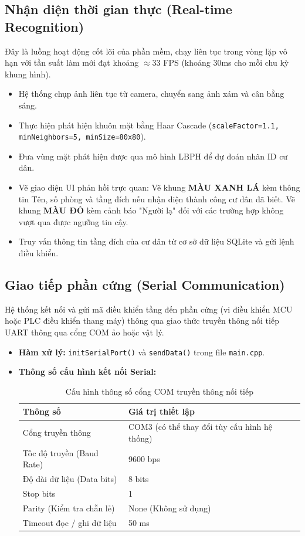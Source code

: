 \documentclass[12pt,a4paper]{article}
\begin{document}
\subsection{Nhận diện thời gian thực (Real-time Recognition)}
Đây là luồng hoạt động cốt lõi của phần mềm, chạy liên tục trong vòng lặp vô hạn với tần suất làm mới đạt khoảng $\approx 33$ FPS (khoảng 30ms cho mỗi chu kỳ khung hình).
\begin{itemize}
    \item Hệ thống chụp ảnh liên tục từ camera, chuyển sang ảnh xám và cân bằng sáng.
    \item Thực hiện phát hiện khuôn mặt bằng Haar Cascade (\texttt{scaleFactor=1.1, minNeighbors=5, minSize=80x80}).
    \item Đưa vùng mặt phát hiện được qua mô hình LBPH để dự đoán nhãn ID cư dân.
    \item Vẽ giao diện UI phản hồi trực quan: Vẽ khung \textbf{MÀU XANH LÁ} kèm thông tin Tên, số phòng và tầng đích nếu nhận diện thành công cư dân đã biết. Vẽ khung \textbf{MÀU ĐỎ} kèm cảnh báo "Người lạ" đối với các trường hợp không vượt qua được ngưỡng tin cậy.
    \item Truy vấn thông tin tầng đích của cư dân từ cơ sở dữ liệu SQLite và gửi lệnh điều khiển.
\end{itemize}

\subsection{Giao tiếp phần cứng (Serial Communication)}
Hệ thống kết nối và gửi mã điều khiển tầng đến phần cứng (vi điều khiển MCU hoặc PLC điều khiển thang máy) thông qua giao thức truyền thông nối tiếp UART thông qua cổng COM ảo hoặc vật lý.
\begin{itemize}
    \item \textbf{Hàm xử lý:} \texttt{initSerialPort()} và \texttt{sendData()} trong file \texttt{main.cpp}.
    \item \textbf{Thông số cấu hình kết nối Serial:}
    \begin{table}[H]
        \centering
        \begin{tabular}{|l|l|}
            \hline
            \textbf{Thông số} & \textbf{Giá trị thiết lập} \\ \hline
            Cổng truyền thông & COM3 (có thể thay đổi tùy cấu hình hệ thống) \\ \hline
            Tốc độ truyền (Baud Rate) & 9600 bps \\ \hline
            Độ dài dữ liệu (Data bits) & 8 bits \\ \hline
            Stop bits & 1 \\ \hline
            Parity (Kiểm tra chẵn lẻ) & None (Không sử dụng) \\ \hline
            Timeout đọc / ghi dữ liệu & 50 ms \\ \hline
        \end{tabular}
        \caption{Cấu hình thông số cổng COM truyền thông nối tiếp}
        \label{tab:serial_config}
    \end{table}
\end{itemize}
\end{document}
